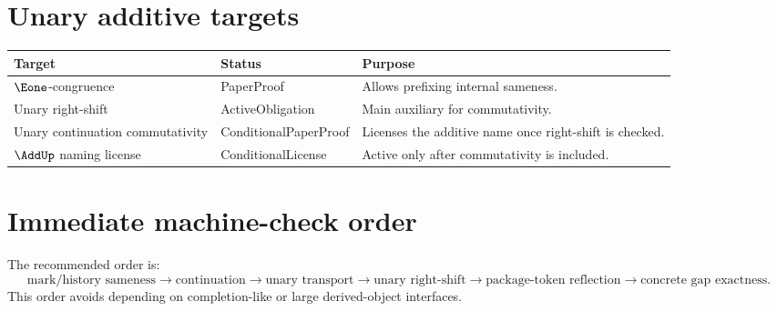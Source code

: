 \section{Unary additive targets}
\begin{longtable}{p{}p{}p{}}
\toprule
\textbf{Target} & \textbf{Status} & \textbf{Purpose}\\
\midrule
\(\Eone\)-congruence & PaperProof & Allows prefixing internal sameness.\\
Unary right-shift & ActiveObligation & Main auxiliary for commutativity.\\
Unary continuation commutativity & ConditionalPaperProof & Licenses the additive name once right-shift is checked.\\
\(\AddUp\) naming license & ConditionalLicense & Active only after commutativity is included.\\
\bottomrule
\end{longtable}

\section{Immediate machine-check order}
The recommended order is:
\[
\text{mark/history sameness}
\to
\text{continuation}
\to
\text{unary transport}
\to
\text{unary right-shift}
\to
\text{package-token reflection}
\to
\text{concrete gap exactness}.
\]
This order avoids depending on completion-like or large derived-object interfaces.
